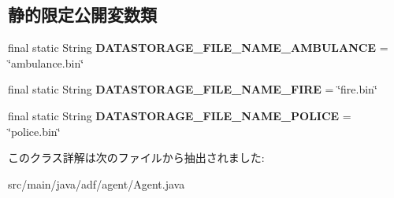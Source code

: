 \subsection*{静的限定公開変数類}
\begin{DoxyCompactItemize}
\item 
\hypertarget{classadf_1_1agent_1_1Agent_acd99fefd69e32605d1fc2924c96eead0}{}\label{classadf_1_1agent_1_1Agent_acd99fefd69e32605d1fc2924c96eead0} 
final static String {\bfseries D\+A\+T\+A\+S\+T\+O\+R\+A\+G\+E\+\_\+\+F\+I\+L\+E\+\_\+\+N\+A\+M\+E\+\_\+\+A\+M\+B\+U\+L\+A\+N\+CE} = \char`\"{}ambulance.\+bin\char`\"{}
\item 
\hypertarget{classadf_1_1agent_1_1Agent_a00421901d5b40dd510ff645de4ed6279}{}\label{classadf_1_1agent_1_1Agent_a00421901d5b40dd510ff645de4ed6279} 
final static String {\bfseries D\+A\+T\+A\+S\+T\+O\+R\+A\+G\+E\+\_\+\+F\+I\+L\+E\+\_\+\+N\+A\+M\+E\+\_\+\+F\+I\+RE} = \char`\"{}fire.\+bin\char`\"{}
\item 
\hypertarget{classadf_1_1agent_1_1Agent_adc72b242cd1a60a0f8274cbcb03728a3}{}\label{classadf_1_1agent_1_1Agent_adc72b242cd1a60a0f8274cbcb03728a3} 
final static String {\bfseries D\+A\+T\+A\+S\+T\+O\+R\+A\+G\+E\+\_\+\+F\+I\+L\+E\+\_\+\+N\+A\+M\+E\+\_\+\+P\+O\+L\+I\+CE} = \char`\"{}police.\+bin\char`\"{}
\end{DoxyCompactItemize}


このクラス詳解は次のファイルから抽出されました\+:\begin{DoxyCompactItemize}
\item 
src/main/java/adf/agent/Agent.\+java\end{DoxyCompactItemize}

